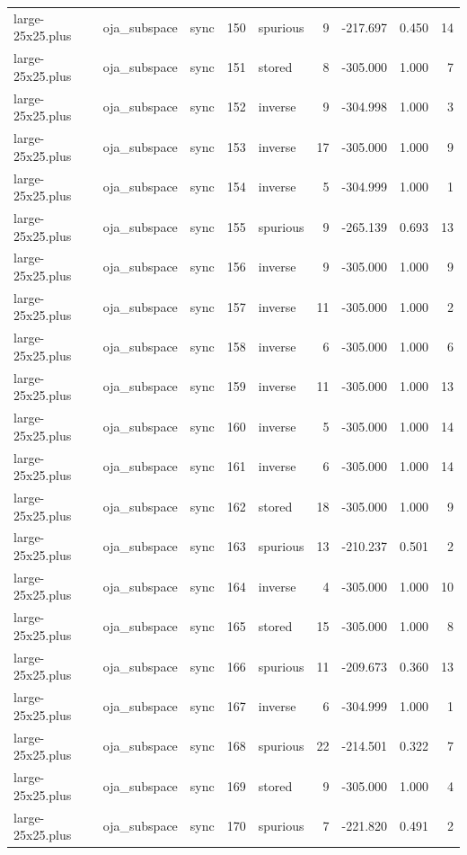 \begin{tabular}{lllrlrrrr}
large-25x25.plus & oja\_subspace & sync & 150 & spurious & 9 & -217.697 & 0.450 & 14 \\
large-25x25.plus & oja\_subspace & sync & 151 & stored & 8 & -305.000 & 1.000 & 7 \\
large-25x25.plus & oja\_subspace & sync & 152 & inverse & 9 & -304.998 & 1.000 & 3 \\
large-25x25.plus & oja\_subspace & sync & 153 & inverse & 17 & -305.000 & 1.000 & 9 \\
large-25x25.plus & oja\_subspace & sync & 154 & inverse & 5 & -304.999 & 1.000 & 1 \\
large-25x25.plus & oja\_subspace & sync & 155 & spurious & 9 & -265.139 & 0.693 & 13 \\
large-25x25.plus & oja\_subspace & sync & 156 & inverse & 9 & -305.000 & 1.000 & 9 \\
large-25x25.plus & oja\_subspace & sync & 157 & inverse & 11 & -305.000 & 1.000 & 2 \\
large-25x25.plus & oja\_subspace & sync & 158 & inverse & 6 & -305.000 & 1.000 & 6 \\
large-25x25.plus & oja\_subspace & sync & 159 & inverse & 11 & -305.000 & 1.000 & 13 \\
large-25x25.plus & oja\_subspace & sync & 160 & inverse & 5 & -305.000 & 1.000 & 14 \\
large-25x25.plus & oja\_subspace & sync & 161 & inverse & 6 & -305.000 & 1.000 & 14 \\
large-25x25.plus & oja\_subspace & sync & 162 & stored & 18 & -305.000 & 1.000 & 9 \\
large-25x25.plus & oja\_subspace & sync & 163 & spurious & 13 & -210.237 & 0.501 & 2 \\
large-25x25.plus & oja\_subspace & sync & 164 & inverse & 4 & -305.000 & 1.000 & 10 \\
large-25x25.plus & oja\_subspace & sync & 165 & stored & 15 & -305.000 & 1.000 & 8 \\
large-25x25.plus & oja\_subspace & sync & 166 & spurious & 11 & -209.673 & 0.360 & 13 \\
large-25x25.plus & oja\_subspace & sync & 167 & inverse & 6 & -304.999 & 1.000 & 1 \\
large-25x25.plus & oja\_subspace & sync & 168 & spurious & 22 & -214.501 & 0.322 & 7 \\
large-25x25.plus & oja\_subspace & sync & 169 & stored & 9 & -305.000 & 1.000 & 4 \\
large-25x25.plus & oja\_subspace & sync & 170 & spurious & 7 & -221.820 & 0.491 & 2 \\

\end{tabular}
